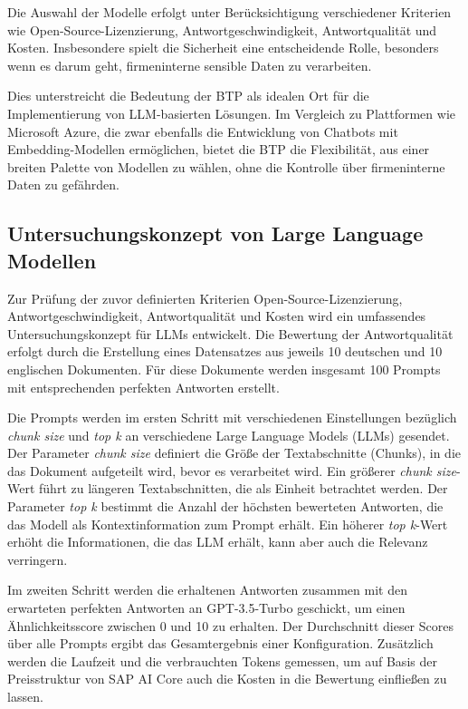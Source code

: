 Die Auswahl der Modelle erfolgt unter Berücksichtigung verschiedener Kriterien wie Open-Source-Lizenzierung, Antwortgeschwindigkeit, Antwortqualität und Kosten. 
Insbesondere spielt die Sicherheit eine entscheidende Rolle, besonders wenn es darum geht, firmeninterne sensible Daten zu verarbeiten. 

Dies unterstreicht die Bedeutung der \ac{BTP} als idealen Ort für die Implementierung von \ac{LLM}-basierten Lösungen. 
Im Vergleich zu Plattformen wie Microsoft Azure, die zwar ebenfalls die Entwicklung von Chatbots mit Embedding-Modellen ermöglichen, bietet die \ac{BTP} die Flexibilität, aus einer breiten Palette von Modellen zu wählen, 
ohne die Kontrolle über firmeninterne Daten zu gefährden.

\subsection{Untersuchungskonzept von Large Language Modellen}
\label{eval_llm_konzept}

Zur Prüfung der zuvor definierten Kriterien Open-Source-Lizenzierung, Antwortgeschwindigkeit, Antwortqualität und Kosten wird ein umfassendes Untersuchungskonzept für \acp{LLM} entwickelt. 
Die Bewertung der Antwortqualität erfolgt durch die Erstellung eines Datensatzes aus jeweils 10 deutschen und 10 englischen Dokumenten. 
Für diese Dokumente werden insgesamt 100 Prompts mit entsprechenden perfekten Antworten erstellt.

Die Prompts werden im ersten Schritt mit verschiedenen Einstellungen bezüglich \textit{chunk size} und \textit{top k} an verschiedene Large Language Models (\acp{LLM}) gesendet. 
Der Parameter \textit{chunk size} definiert die Größe der Textabschnitte (Chunks), in die das Dokument aufgeteilt wird, bevor es verarbeitet wird. 
Ein größerer \textit{chunk size}-Wert führt zu längeren Textabschnitten, die als Einheit betrachtet werden. Der Parameter \textit{top k} bestimmt die Anzahl der höchsten bewerteten Antworten, die das Modell als Kontextinformation zum Prompt erhält. 
Ein höherer \textit{top k}-Wert erhöht die Informationen, die das \ac{LLM} erhält, kann aber auch die Relevanz verringern.

Im zweiten Schritt werden die erhaltenen Antworten zusammen mit den erwarteten perfekten Antworten an GPT-3.5-Turbo geschickt, um einen Ähnlichkeitsscore zwischen 0 und 10 zu erhalten. 
Der Durchschnitt dieser Scores über alle Prompts ergibt das Gesamtergebnis einer Konfiguration. 
Zusätzlich werden die Laufzeit und die verbrauchten Tokens gemessen, um auf Basis der Preisstruktur von SAP AI Core auch die Kosten in die Bewertung einfließen zu lassen.

